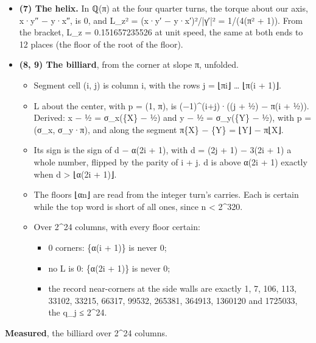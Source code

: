 \begin{itemize}
\item \textbf{(7) The helix.} In ℚ(π) at the four quarter turns, the torque about our axis, x·y″ − y·x″, is 0, and L\_\allowbreak{}z² = (x·y′ − y·x′)²/|γ′|² = 1/(4(π² + 1)). From the bracket, L\_\allowbreak{}z = 0.151657235526 at unit speed, the same at both ends to 12 places (the floor of the root of the floor).
\item \textbf{(8, 9) The billiard}, from the corner at slope π, unfolded.

\begin{itemize}
\item Segment cell (i, j) is column i, with the rows j = ⌊πi⌋ … ⌊π(i + 1)⌋.
\item L about the center, with p = (1, π), is (−1)\textasciicircum{}(i+j)·((j + ½) − π(i + ½)). Derived: x − ½ = σ\_\allowbreak{}x(\{X\} − ½) and y − ½ = σ\_\allowbreak{}y(\{Y\} − ½), with p = (σ\_\allowbreak{}x, σ\_\allowbreak{}y·π), and along the segment π\{X\} − \{Y\} = ⌊Y⌋ − π⌊X⌋.
\item Its sign is the sign of d − α(2i + 1), with d = (2j + 1) − 3(2i + 1) a whole number, flipped by the parity of i + j. d is above α(2i + 1) exactly when d > ⌊α(2i + 1)⌋.
\item The floors ⌊αn⌋ are read from the integer turn's carries. Each is certain while the top word is short of all ones, since n < 2\textasciicircum{}320.
\item Over 2\textasciicircum{}24 columns, with every floor certain:

\begin{itemize}
\item 0 corners: \{α(i + 1)\} is never 0;
\item no L is 0: \{α(2i + 1)\} is never 0;
\item the record near-corners at the side walls are exactly 1, 7, 106, 113, 33102, 33215, 66317, 99532, 265381, 364913, 1360120 and 1725033, the q\_\allowbreak{}j ≤ 2\textasciicircum{}24.
\end{itemize}
\end{itemize}
\end{itemize}

\textbf{Measured}, the billiard over 2\textasciicircum{}24 columns.

